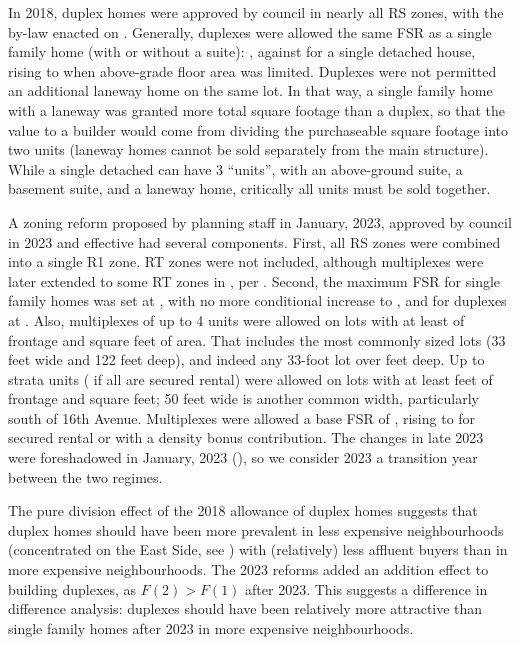\documentclass[12pt]{article}
\begin{document}
In \duplexCouncilMonth{} 2018, duplex homes were approved by council in nearly all RS zones, with the by-law enacted on \duplexEnactedDate{}. Generally, duplexes were allowed the same FSR as a single family home (with or without a suite): \rsDuplexFSR{}, against \rsSingleBaseFSR{} for a single detached house, rising to \rsSingleMaxFSR{} when above-grade floor area was limited. Duplexes were not permitted an additional laneway home on the same lot. In that way, a single family home with a laneway was granted more total square footage than a duplex, so that the value to a builder would come from dividing the purchaseable square footage into two units (laneway homes cannot be sold separately from the main structure). While a single detached can have 3 ``units'', with an above-ground suite, a basement suite, and a laneway home, critically all units must be sold together.

A zoning reform proposed by planning staff in January, 2023, approved by council in \rOneCouncilMonth{} 2023 and effective \rOneEffectiveDate{} had several components. First, all RS zones were combined into a single R1 zone. RT zones were not included, although multiplexes were later extended to some RT zones in \rOneMultiplexRTYear{}, per \textcite{vonBergmannMultiplex2025}. Second, the maximum FSR for single family homes was set at \rOneSingleFSR{}, with no more conditional increase to \rsSingleMaxFSR{}, and for duplexes at \rOneDuplexFSR{} \parencite{CoVR1Schedule}. Also, multiplexes of up to 4 units were allowed on lots with at least \rOneFourUnitFrontageFt{}  of frontage and \rOneFourUnitAreaFt{} square feet of area. That includes the most commonly sized lots (33 feet wide and 122 feet deep), and indeed any 33-foot lot over \rOneFourUnitDepthThirtyThreeFt{} feet deep. Up to \rOneSixUnitMax{} strata units (\rOneRentalUnitMax{} if all are secured rental) were allowed on lots with at least \rOneSixUnitFrontageFt{} feet of frontage and \rOneSixUnitAreaM{} \rOneSixUnitAreaFt{} square feet; 50 feet wide is another common width, particularly south of 16th Avenue. Multiplexes were allowed a base FSR of \rOneMultiplexBaseFSR{}, rising to \rOneMultiplexMaxFSR{} for secured rental or with a density bonus contribution. The changes in late 2023 were foreshadowed in January, 2023 (\textcite{CoV2023January}), so we consider 2023 a transition year between the two regimes.

The pure division effect of the 2018 allowance of duplex homes suggests that duplex homes should have been more prevalent in less expensive neighbourhoods (concentrated on the East Side, see \textcite{SanghoonDaryl}) with (relatively) less affluent buyers than in more expensive neighbourhoods. The 2023 reforms added an addition effect to building duplexes, as $F(2)>F(1)$ after 2023. This suggests a difference in difference analysis: duplexes should have been relatively more attractive than single family homes after 2023 in more expensive neighbourhoods. 
\end{document}
